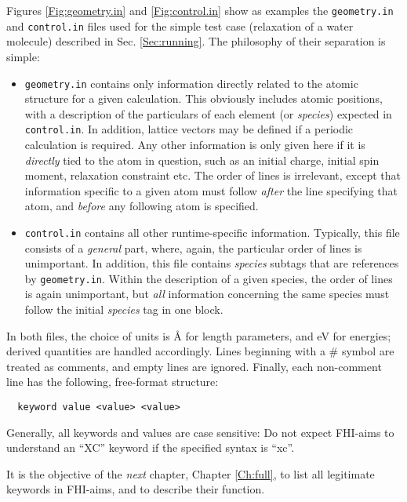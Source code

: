 Figures \ref{Fig:geometry.in} and \ref{Fig:control.in} show as examples the
\texttt{geometry.in} and \texttt{control.in} files used for the simple test
case (relaxation of a water molecule) described in Sec. \ref{Sec:running}. The
philosophy of their separation is simple:
\begin{itemize}
  \item \texttt{geometry.in} contains only information directly related to the
    atomic structure for a given calculation. This obviously includes atomic
    positions, with a description of the particulars of each element (or
    \emph{species}) expected in \texttt{control.in}. In addition, lattice
    vectors may be defined if a periodic calculation is required. Any other
    information is only given here if it is \emph{directly} tied to the atom
    in question, such as an initial charge, initial spin moment, relaxation
    constraint etc. The order of lines is irrelevant, except that information
    specific to a given atom must follow \emph{after} the line specifying that
    atom, and \emph{before} any following atom is specified.
  \item \texttt{control.in} contains all other runtime-specific
    information. Typically, this file consists of a \emph{general} part,
    where, again, the particular order of lines is unimportant. In addition,
    this file contains \emph{species} subtags that are references by
    \texttt{geometry.in}. Within the description of a given species, the order
    of lines is again unimportant, but \emph{all} information concerning the
    same species must follow the initial \emph{species} tag in one block.
\end{itemize}
In both files, the choice of units is {\AA} for length parameters, and eV for
energies; derived quantities are handled accordingly. Lines beginning with a \#
symbol are treated as comments, and empty lines are ignored. Finally, each
non-comment line has the following, free-format structure:

\begin{verbatim}
  keyword value <value> <value>
\end{verbatim}

Generally, all keywords and values are case sensitive: Do not expect FHI-aims
to understand an ``XC'' keyword if the specified syntax is ``xc''. 

It is the objective of the \emph{next} chapter, Chapter \ref{Ch:full},
to list all legitimate keywords in FHI-aims, and to describe their
function. 

